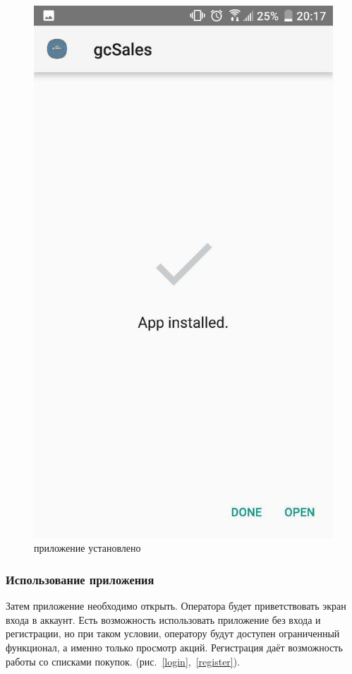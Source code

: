 \begin{figure}[h!]
    \includegraphics[height=0.38\textheight]{./screenshots/3/install_3.jpg}
    \caption{\small{приложение установлено}}
    \label{install3}
    \endminipage{}
\end{figure}


\subsubsection{Использование приложения}
Затем приложение необходимо открыть. Оператора будет приветствовать экран входа
в аккаунт. Есть возможность использовать приложение без входа и регистрации, но
при таком условии, оператору будут доступен ограниченный функционал, а именно
только просмотр акций. Регистрация даёт возможность работы со списками покупок.
(рис.~\ref{login},~\ref{register}).

